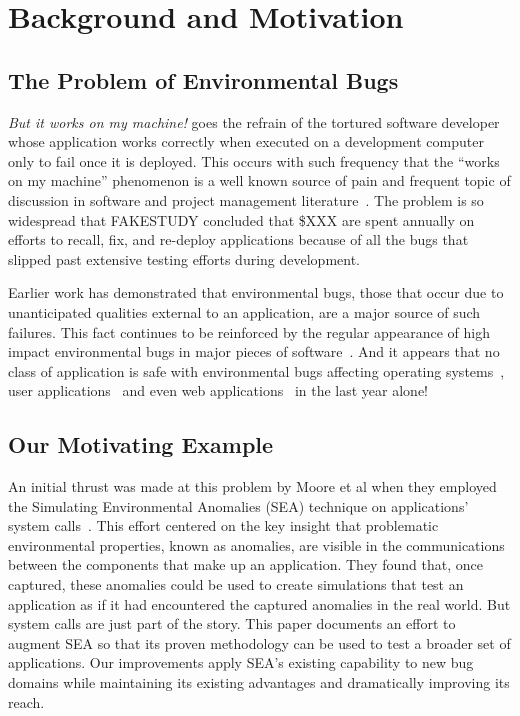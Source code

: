 \section{Background and Motivation}
\label{SEC:background}

\subsection{The Problem of Environmental Bugs}

\textit{But it works on my machine!} goes the refrain of the tortured
software developer whose application works correctly when executed on a
development computer only to fail once it is deployed.  This occurs with
such frequency that the ``works on my machine'' phenomenon is a well known
source of pain
and frequent topic of discussion
in software and project management
literature~\cite{notreal}.
The problem is so widespread
that FAKESTUDY concluded
that \$XXX are spent annually on efforts to
recall,
fix,
and re-deploy applications
because of all the bugs
that slipped past extensive testing efforts
during development.

Earlier work has demonstrated that environmental bugs, those that occur due
to unanticipated qualities external to an application, are a major source
of such failures.  This fact continues to be reinforced by the regular
appearance of high impact environmental bugs in major pieces of
software~\cite{devzeroroot}.  And it appears that no class of application
is safe with environmental bugs affecting operating systems~\cite{bad},
user applications~\cite{bad} and even web applications~\cite{bad} in the
last year alone!

\subsection{Our Motivating Example}

An initial thrust was made at this problem by Moore et al
when they employed
the Simulating Environmental Anomalies (SEA) technique
on applications' system calls~\cite{crashsim}.
This effort centered on the key insight
that problematic
environmental properties,
known as anomalies, are visible in the
communications between the components that make up an application.
They found that,
once captured,
these anomalies
could be
used to create simulations
that test
an application as if
it had encountered the captured anomalies
in the real world.
But system calls are just part of the story.
This paper documents an effort to augment SEA
so that its proven methodology
can be used to test a broader set of applications.
Our improvements
apply SEA's existing capability
to new bug domains
while maintaining its existing advantages and
dramatically
improving its reach.


